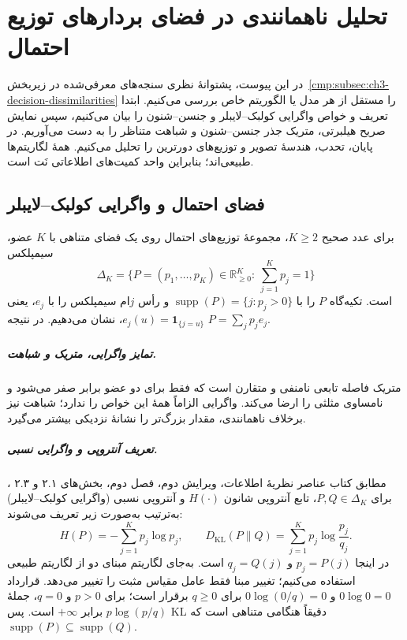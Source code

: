\chapter{تحلیل ناهمانندی در فضای بردارهای توزیع احتمال}
\label{app:probability-dissimilarity}
در این پیوست، پشتوانهٔ نظری سنجه‌های معرفی‌شده در زیربخش~\ref{cmp:subsec:ch3-decision-dissimilarities} را مستقل از هر مدل یا الگوریتم خاص بررسی می‌کنیم. ابتدا تعریف و خواص واگرایی کولبک--لایبلر و جنسن--شنون را بیان می‌کنیم، سپس نمایش صریح هیلبرتی، متریک جذر جنسن--شنون و شباهت متناظر را به دست می‌آوریم. در پایان، تحدب، هندسهٔ تصویر و توزیع‌های دورترین را تحلیل می‌کنیم. همهٔ لگاریتم‌ها طبیعی‌اند؛ بنابراین واحد کمیت‌های اطلاعاتی نَت است.

\section{فضای احتمال و واگرایی کولبک--لایبلر}
\label{cmp:subsec:ch3-probability-distance-similarity}
\label{cmp:subsec:ch3-probability-dissimilarity-families}
برای عدد صحیح $K\ge2$، مجموعهٔ توزیع‌های احتمال روی یک فضای متناهی با $K$ عضو، سیمپلکس
\begin{equation}\label{eq:app-pd-simplex}
\Delta_K=\{P=(p_1,\ldots,p_K)\in\mathbb R_{\ge0}^K:\ \sum_{j=1}^Kp_j=1\}
\end{equation}
است. تکیه‌گاه $P$ را با $\operatorname{supp}(P)=\{j:p_j>0\}$ و رأس $j$ام سیمپلکس را با $e_j$، یعنی $e_j(u)=\mathbf1_{\{j=u\}}$، نشان می‌دهیم. در نتیجه $P=\sum_jp_je_j$.

\paragraph{تمایز واگرایی، متریک و شباهت.}
متریک فاصله تابعی نامنفی و متقارن است که فقط برای دو عضو برابر صفر می‌شود و نامساوی مثلثی را ارضا می‌کند. واگرایی الزاماً همهٔ این خواص را ندارد؛ شباهت نیز برخلاف ناهمانندی، مقدار بزرگ‌تر را نشانهٔ نزدیکی بیشتر می‌گیرد.

\paragraph{تعریف آنتروپی و واگرایی نسبی.}
مطابق کتاب عناصر نظریهٔ اطلاعات، ویرایش دوم، فصل دوم، بخش‌های ۲.۱ و ۲.۳ \cite{CoverThomas2006}، برای $P,Q\in\Delta_K$، تابع آنتروپی شانون $H(\cdot)$ و آنتروپی نسبی (واگرایی کولبک--لایبلر) به‌ترتیب به‌صورت زیر تعریف می‌شوند:
\begin{equation}\label{eq:app-pd-kl}
H(P)=-\sum_{j=1}^Kp_j\log p_j,\qquad
D_{\mathrm{KL}}(P\|Q)=\sum_{j=1}^Kp_j\log\frac{p_j}{q_j}.
\end{equation}
در اینجا $p_j=P(j)$ و $q_j=Q(j)$ است. به‌جای لگاریتم مبنای دو از لگاریتم طبیعی استفاده می‌کنیم؛ تغییر مبنا فقط عامل مقیاس مثبت را تغییر می‌دهد. قرارداد $0\log0=0$ و $0\log(0/q)=0$ برای $q\ge0$ برقرار است؛ برای $p>0$ و $q=0$، جملهٔ $p\log(p/q)$ برابر $+\infty$ است. پس KL دقیقاً هنگامی متناهی است که $\operatorname{supp}(P)\subseteq\operatorname{supp}(Q)$.

